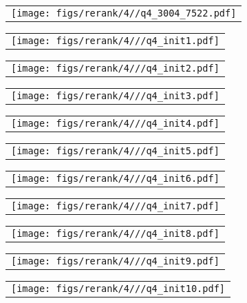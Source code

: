 \begin{figure*}[t]
\vspace{2ex}

\begin{tabular}{@{\sssp}c@{\sssp}}\texttt{[image: figs/rerank/4//q4\_3004\_7522.pdf]}\end{tabular} 
\begin{tabular}{@{\sssp}c@{\sssp}}\texttt{[image: figs/rerank/4///q4\_init1.pdf]}\end{tabular}
\begin{tabular}{@{\sssp}c@{\sssp}}\texttt{[image: figs/rerank/4///q4\_init2.pdf]}\end{tabular}
\begin{tabular}{@{\sssp}c@{\sssp}}\texttt{[image: figs/rerank/4///q4\_init3.pdf]}\end{tabular}
\begin{tabular}{@{\sssp}c@{\sssp}}\texttt{[image: figs/rerank/4///q4\_init4.pdf]}\end{tabular}
\begin{tabular}{@{\sssp}c@{\sssp}}\texttt{[image: figs/rerank/4///q4\_init5.pdf]}\end{tabular}
\begin{tabular}{@{\sssp}c@{\sssp}}\texttt{[image: figs/rerank/4///q4\_init6.pdf]}\end{tabular}
\begin{tabular}{@{\sssp}c@{\sssp}}\texttt{[image: figs/rerank/4///q4\_init7.pdf]}\end{tabular}
\begin{tabular}{@{\sssp}c@{\sssp}}\texttt{[image: figs/rerank/4///q4\_init8.pdf]}\end{tabular}
\begin{tabular}{@{\sssp}c@{\sssp}}\texttt{[image: figs/rerank/4///q4\_init9.pdf]}\end{tabular}
\begin{tabular}{@{\sssp}c@{\sssp}}\texttt{[image: figs/rerank/4///q4\_init10.pdf]}\end{tabular}


\end{figure*}
